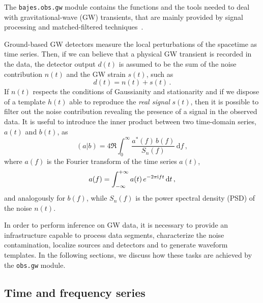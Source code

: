 \documentclass[prd,aps,twocolumn,a4paper,showkeys,nofootinbib,floatfix]{revtex4-1}
\newcommand{\be}{\begin{equation}}
\newcommand{\ee}{\end{equation}}
\def\i{{\rm i}}
\def\d{\text{d}}
\begin{document}
The {\tt bajes.obs.gw} module contains the functions and the tools needed to deal
with gravitational-wave (GW) transients, that are mainly provided
 by signal processing and matched-filtered techniques~\cite{LIGOScientific:2019hgc}.
 
Ground-based GW detectors measure the local 
perturbations of the spacetime as time series. Then,
if we can believe that a physical GW transient is 
recorded in the data,
the detector output $d(t)$ is assumed to be 
the sum of the noise contribution $n(t)$ and 
the GW strain $s(t)$, such as
 \be
\label{eq:signal}
d(t) = n(t) + s(t)\,.
\ee
If $n(t)$ respects the conditions of Gaussianity and stationarity
and if we dispose of a template $h(t)$ able to reproduce 
the {\it real signal} $s(t)$,
then it is possible to filter out the noise contribution revealing the presence 
of a signal in the observed data.
 It is useful to introduce the inner product between 
 two time-domain series, $a(t)$ and $b(t)$, as 
 \be
 \label{eq:innerprod}
 (a|b) = 4 \Re \int_0^{\infty} \frac{a^*(f)\,b(f)}{S_n(f)}\,\d f\,,
 \ee
where $a(f)$ is the Fourier transform of the time series $a(t)$,
 \be
\label{eq:fourier}
a(f) = \int_{-\infty}^{+\infty} a(t)\, e^{-2\pi \i f t }\,\d t \,,
\ee
and analogously for $b(f)$, 
while $S_n(f)$ is the power spectral density (PSD) of the noise $n(t)$.

In order to perform inference on GW data,
it is necessary to provide an infrastructure capable
to process data segments, 
characterize the noise contamination,
localize sources and detectors and 
to generate waveform templates.
In the following sections, 
we discuss how these tasks are achieved 
by the {\tt obs.gw} module.

\subsection{Time and frequency series} 
\label{sec:series}
\end{document}

